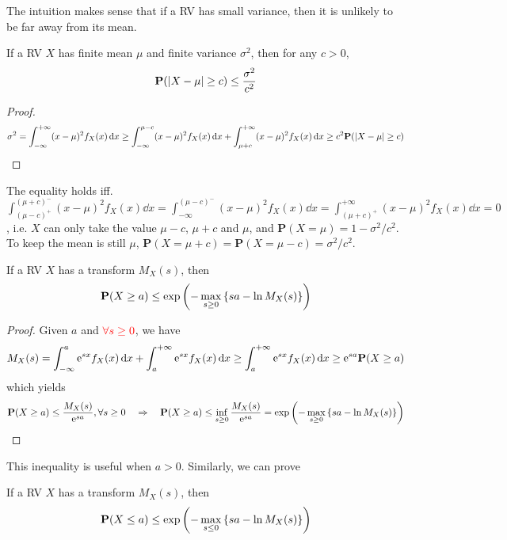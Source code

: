 \documentclass[device=normal, lang=en]{elegantbook}
\numberwithin{equation}{section}
\begin{document}
The intuition makes sense that if a RV has small variance, then it is unlikely to be far away from its mean.
\begin{theorem}
    If a RV $X$ has finite mean $\mu$ and finite variance $\sigma^2$, then for any $c > 0$,
    \begin{equation}
        \mathbf{P}(\abs{X - \mu} \geq c) \leq \frac{\sigma^2}{c^2}
    \end{equation}
\end{theorem}
\begin{proof}
    \begin{equation}
        \sigma^2 = \int_{-\infty}^{+\infty} (x - \mu)^2 f_X(x) \dd{x} \geq \int_{-\infty}^{\mu - c} (x - \mu)^2 f_X(x) \dd{x} + \int_{\mu + c}^{+\infty} (x - \mu)^2 f_X(x) \dd{x} \geq c^2 \mathbf{P}(\abs{X - \mu} \geq c)
    \end{equation}
\end{proof}
The equality holds iff. $\int_{(\mu-c)^+}^{(\mu+c)^-} (x - \mu)^2 f_X(x) \dd{x} = \int_{-\infty}^{(\mu-c)^-} (x - \mu)^2 f_X(x) \dd{x} = \int_{(\mu+c)^{+}}^{+\infty} (x - \mu)^2 f_X(x) \dd{x} = 0$, i.e. $X$ can only take the value $\mu - c$, $\mu + c$ and $\mu$, and $\mathbf{P}(X = \mu) = 1 - \sigma^2/c^2$. To keep the mean is still $\mu$, $\mathbf{P}(X = \mu + c) = \mathbf{P}(X = \mu - c) = \sigma^2/c^2$.

\begin{theorem}
    If a RV $X$ has a transform $M_{X}(s)$, then
    \begin{equation}
        \mathbf{P}(X \geq a) \leq \exp\qty(-\max_{s \geq 0} \qty{sa - \ln M_{X}(s)})
    \end{equation}
\end{theorem}
\begin{proof}
    Given $a$ and $\textcolor{red}{\forall s \geq 0}$, we have
    \begin{equation}
        M_X(s) = \int_{-\infty}^{a} \mathrm{e}^{sx} f_X(x) \dd{x} + \int_{a}^{+\infty} \mathrm{e}^{sx} f_X(x) \dd{x} \geq \int_{a}^{+\infty} \mathrm{e}^{sx} f_X(x) \dd{x} \geq \mathrm{e}^{sa} \mathbf{P}(X \geq a)
    \end{equation}
    which yields
    \begin{equation}
        \mathbf{P}(X \geq a) \leq \frac{M_X(s)}{\mathrm{e}^{sa}}, \forall s \geq 0 \quad\Rightarrow\quad \mathbf{P}(X \geq a) \leq \inf_{s \geq 0} \frac{M_X(s)}{\mathrm{e}^{sa}} = \exp\qty(-\max_{s \geq 0} \qty{sa - \ln M_{X}(s)})
    \end{equation}
\end{proof}
This inequality is useful when $a > 0$. Similarly, we can prove
\begin{theorem}
    If a RV $X$ has a transform $M_{X}(s)$, then
    \begin{equation}
        \mathbf{P}(X \leq a) \leq \exp\qty(-\max_{s \leq 0} \qty{sa - \ln M_{X}(s)})
    \end{equation}
\end{theorem}
\end{document}
